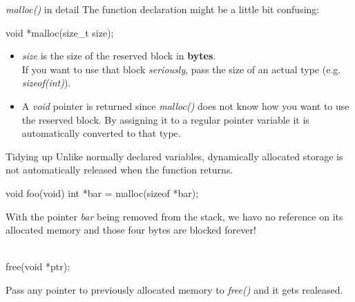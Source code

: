 \documentclass[10pt,graphics,aspectratio=169,table]{beamer}
\begin{document}
\begin{frame}[fragile]{\textit{malloc()} in detail}
	The function declaration might be a little bit confusing:
	\begin{codeblock}
void *malloc(size_t size);
    \end{codeblock}
	\begin{itemize}
		\item \textit{size} is the size of the reserved block in \textbf{bytes}. \\
		If you want to use that block \textit{seriously}, pass the size of an actual type (e.g. \textit{sizeof(int)}).
		\item A \textit{void} pointer is returned since \textit{malloc()} does not know how you want to use the reserved block. By assigning it to a regular pointer variable it is automatically converted to that type.
	\end{itemize}
\end{frame}
\begin{frame}[fragile]{Tidying up}
	Unlike normally declared variables, dynamically allocated storage is not automatically released when the function returns.
	\begin{codeblock}
void foo(void) {
	int *bar = malloc(sizeof *bar);
}
\end{codeblock}
	
With the pointer \textit{bar} being removed from the stack, we havo no reference on its allocated memory and those four bytes are blocked forever! \\
	\ \\
	\begin{codeblock}
free(void *ptr);
\end{codeblock}

Pass any pointer to previously allocated memory to \textit{free()} and it gets realeased.
\end{frame}
\end{document}
